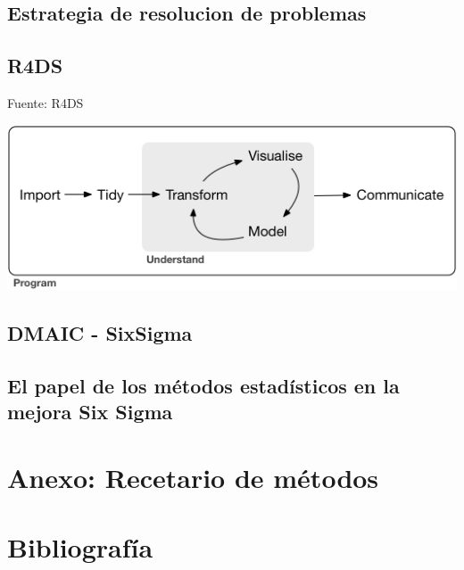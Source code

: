 \documentclass[
  letterpaper,
  DIV=11,
  numbers=noendperiod,
  oneside]{scrreprt}
\begin{document}
\hypertarget{estrategia-de-resolucion-de-problemas}{%
\section{Estrategia de resolucion de
problemas}\label{estrategia-de-resolucion-de-problemas}}

\hypertarget{r4ds}{%
\section{R4DS}\label{r4ds}}

Fuente: R4DS

\includegraphics{01-imagenes/data-science.png}

\hypertarget{dmaic---sixsigma}{%
\section{DMAIC - SixSigma}\label{dmaic---sixsigma}}

\hypertarget{el-papel-de-los-muxe9todos-estaduxedsticos-en-la-mejora-six-sigma}{%
\section{El papel de los métodos estadísticos en la mejora Six
Sigma}\label{el-papel-de-los-muxe9todos-estaduxedsticos-en-la-mejora-six-sigma}}


\hypertarget{anexo-recetario-de-muxe9todos}{%
\chapter{Anexo: Recetario de
métodos}\label{anexo-recetario-de-muxe9todos}}


\hypertarget{bibliografuxeda}{%
\chapter*{Bibliografía}\label{bibliografuxeda}}
\end{document}

